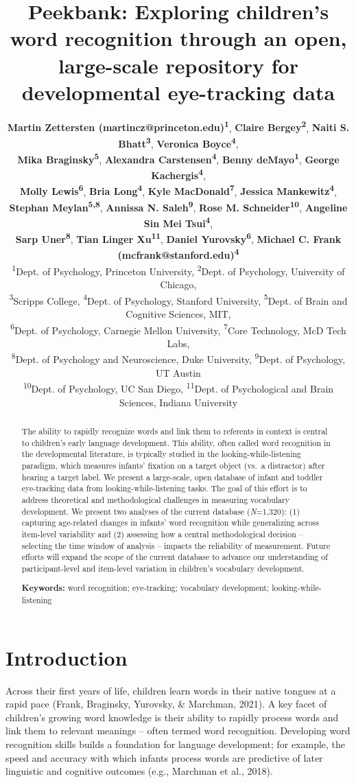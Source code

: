 \documentclass[10pt, letterpaper]{article}
\title{Peekbank: Exploring children's word recognition through an open,
large-scale repository for developmental eye-tracking data}
\author{{\large \bf Martin Zettersten (martincz@princeton.edu)\textsuperscript{1}}, {\large \bf Claire Bergey\textsuperscript{2}}, {\large \bf Naiti S. Bhatt\textsuperscript{3}}, {\large \bf Veronica Boyce\textsuperscript{4}},  \\ {\large \bf Mika Braginsky\textsuperscript{5}}, {\large \bf Alexandra Carstensen\textsuperscript{4}}, {\large \bf Benny deMayo\textsuperscript{1}}, {\large \bf George Kachergis\textsuperscript{4}},  \\ {\large \bf Molly Lewis\textsuperscript{6}}, {\large \bf Bria Long\textsuperscript{4}}, {\large \bf Kyle MacDonald\textsuperscript{7}}, {\large \bf Jessica Mankewitz\textsuperscript{4}},  \\ {\large \bf Stephan Meylan\textsuperscript{5,8}}, {\large \bf Annissa N. Saleh\textsuperscript{9}}, {\large \bf Rose M. Schneider\textsuperscript{10}}, {\large \bf Angeline Sin Mei Tsui\textsuperscript{4}},  \\ {\large \bf Sarp Uner\textsuperscript{8}}, {\large \bf Tian Linger Xu\textsuperscript{11}}, {\large \bf Daniel Yurovsky\textsuperscript{6}}, {\large \bf Michael C. Frank (mcfrank@stanford.edu)\textsuperscript{4}}  \\ {\textsuperscript{1}}Dept. of Psychology, Princeton University, {\textsuperscript{2}}Dept. of Psychology, University of Chicago,  \\ {\textsuperscript{3}}Scripps College, {\textsuperscript{4}}Dept. of Psychology, Stanford University, {\textsuperscript{5}}Dept. of Brain and Cognitive Sciences, MIT,  \\ {\textsuperscript{6}}Dept. of Psychology, Carnegie Mellon University, {\textsuperscript{7}}Core Technology, McD Tech Labs,  \\ {\textsuperscript{8}}Dept. of Psychology and Neuroscience, Duke University, {\textsuperscript{9}}Dept. of Psychology, UT Austin \\ {\textsuperscript{10}}Dept. of Psychology, UC San Diego, {\textsuperscript{11}}Dept. of Psychological and Brain Sciences, Indiana University}
\begin{document}
\maketitle

\begin{abstract}
The ability to rapidly recognize words and link them to referents in
context is central to children's early language development. This
ability, often called word recognition in the developmental literature,
is typically studied in the looking-while-listening paradigm, which
measures infants' fixation on a target object (vs.~a distractor) after
hearing a target label. We present a large-scale, open database of
infant and toddler eye-tracking data from looking-while-listening tasks.
The goal of this effort is to address theoretical and methodological
challenges in measuring vocabulary development. We present two analyses
of the current database (\emph{N}=1,320): (1) capturing age-related
changes in infants' word recognition while generalizing across
item-level variability and (2) assessing how a central methodological
decision -- selecting the time window of analysis -- impacts the
reliability of measurement. Future efforts will expand the scope of the
current database to advance our understanding of participant-level and
item-level variation in children's vocabulary development.

\textbf{Keywords:}
word recognition; eye-tracking; vocabulary development;
looking-while-listening
\end{abstract}

\hypertarget{introduction}{%
\section{Introduction}\label{introduction}}

Across their first years of life, children learn words in their native
tongues at a rapid pace (Frank, Braginsky, Yurovsky, \& Marchman, 2021).
A key facet of children's growing word knowledge is their ability to
rapidly process words and link them to relevant meanings -- often termed
word recognition. Developing word recognition skills builds a foundation
for language development; for example, the speed and accuracy with which
infants process words are predictive of later linguistic and cognitive
outcomes (e.g., Marchman et al., 2018).
\end{document}
